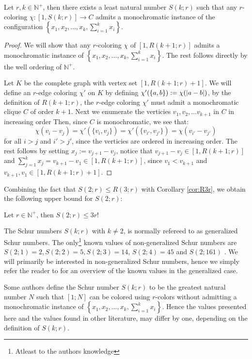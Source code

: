 \begin{theorem}\label{thm:additive_schur}
	Let $r, k \in \mathbb{N}^{+}$, then there exists a least natural number $S(k; r)$ such that any $r$-coloring $\chi: [1, S(k; r)] \to C$ admits a monochromatic instance of the configuration $\left\{x_1, x_2, \ldots, x_{k}, \sum_{i = 1}^k x_i\right\}$.
\end{theorem}
\begin{proof}
	We will show that any $r$-coloring $\chi$ of $[1, R(k + 1; r)]$ admits a monochromatic instance of $\left\{x_1, x_2, \ldots, x_{k}, \sum_{i = 1}^k x_i\right\}$. The rest follows directly by the well ordering of $\mathbb{N}^{+}$.

	Let $K$ be the complete graph with vertex set $[1, R(k + 1; r) + 1]$. We will define an $r$-edge coloring $\chi'$ on $K$ by defining $\chi'(\left\{a, b\right\}) := \chi(\left\lvert a - b\right\rvert)$, by the definition of $R(k + 1; r)$, the $r$-edge coloring $\chi'$ must admit a monochromatic clique $C$ of order $k + 1$. Next we enumerate the verticies $v_1, v_2, \ldots v_{k + 1}$ in $C$ in increasing order
	Then, since $C$ is monochromatic, we see that:
	\begin{equation*}
		\chi(v_i - v_j) = \chi'(\{v_i, v_j\}) = \chi'(\{v_{i'}, v_{j'} \}) = \chi(v_{i'} - v_{j'})
	\end{equation*}
	for all $i > j$ and $i' > j'$, since the verticies are ordered in increasing order. The rest follows by setting $x_j := v_{j + 1} - v_{j}$, notice that $v_{j + 1} - v_j \in [1, R(k + 1; r)]$ and $\sum_{j = 1}^k x_{j} = v_{k + 1} - v_{1} \in [1, R(k + 1; r)]$, since $v_1 < v_{k + 1}$ and $v_{k + 1}, v_1 \in [1, R(k + 1;r) + 1]$.
\end{proof}
Combining the fact that $S(2; r) \leq R(3; r)$ with Corollary \ref{cor:R3r}, we obtain the following upper bound for $S(2; r)$:
\begin{corollary}\label{cor:schur_upper}
  Let $r \in \mathbb{N}^{+}$, then $S(2; r) \leq 3r!$
\end{corollary}
The Schur numbers $S(k; r)$ with $k \neq 2$, is normally refereed to as generalized Schur numbers. The only\footnote{Atleast to the authors knowledge} known values of non-generalized Schur numbers are $S(2; 1) = 2, S(2; 2) = 5, S(2; 3) = 14$, $S(2; 4) = 45$ \cite{fourth_schur_number} and $S(2; 161)$ \cite{fidth_schur_number}. We will primarily be interested in non-generalized Schur numbers, hence we simply refer the reader to \cite{generalized_schur_numbers} for an overview of the known values in the generalized case.
\begin{remark}
	Some authors define the Schur number $S(k; r)$ to be the greatest natural number $N$ such that $[1; N]$ can be colored using $r$-colors without admitting a monochromatic instance of $\left\{x_1, x_2, \ldots, x_{k}, \sum_{i = 1}^k x_i\right\}$. Hence the values presented here and the values found in other literature, may differ by one, depending on the definition of $S(k; r)$.
\end{remark} %


